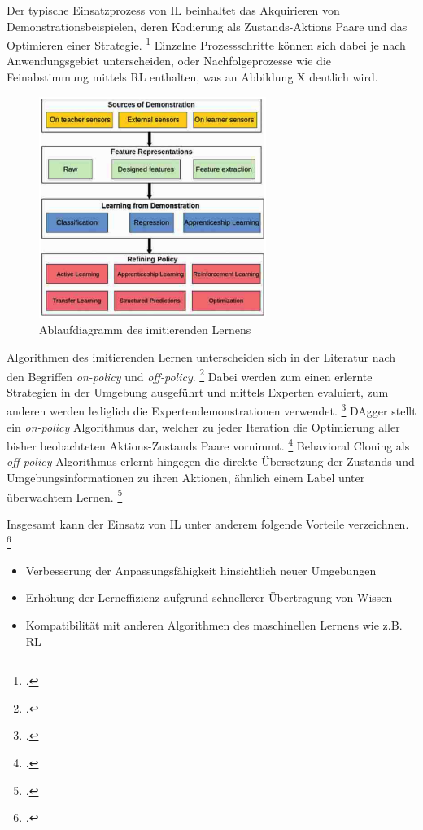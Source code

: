 Der typische Einsatzprozess von IL beinhaltet das Akquirieren von Demonstrationsbeispielen, deren Kodierung als Zustands-Aktions Paare und das Optimieren einer Strategie. \footcite[Vgl.][S. 3]{Hussein.2017}
Einzelne Prozessschritte können sich dabei je nach Anwendungsgebiet unterscheiden, oder Nachfolgeprozesse wie die Feinabstimmung mittels RL enthalten, was an Abbildung X deutlich wird.
\begin{figure}[htb]
    \centering
    \includegraphics[height=7.2cm]{lib/graphics/IL flowchart.png}
    \caption[Ablaufdiagramm des imitierenden Lernens]{Ablaufdiagramm des imitierenden Lernens\footnotemark}
    \label{abb:IL-process-flowchart}
\end{figure}

Algorithmen des imitierenden Lernen unterscheiden sich in der Literatur nach den Begriffen \textit{on-policy} und \textit{off-policy}. \footcite[Vgl.][S. 3]{Ashwin.2020}
Dabei werden zum einen erlernte Strategien in der Umgebung ausgeführt und mittels Experten evaluiert, zum anderen werden lediglich die Expertendemonstrationen verwendet. \footcite[Vgl.][S. 3]{Ashwin.2020}
DAgger stellt ein \textit{on-policy} Algorithmus dar, welcher zu jeder Iteration die Optimierung aller bisher beobachteten Aktions-Zustands Paare vornimmt. \footcite[Vgl.][S. 5]{attia.2018}
Behavioral Cloning als \textit{off-policy} Algorithmus erlernt hingegen die direkte Übersetzung der Zustands-und Umgebungsinformationen zu ihren Aktionen, ähnlich einem Label unter überwachtem Lernen. \footcite[Vgl.][S. 4]{fang.2019}

Insgesamt kann der Einsatz von IL unter anderem folgende Vorteile verzeichnen. \footcite[Vgl.][S. 1]{fang.2019}
\begin{itemize}
    \item Verbesserung der Anpassungsfähigkeit hinsichtlich neuer Umgebungen
    \item Erhöhung der Lerneffizienz aufgrund schnellerer Übertragung von Wissen
    \item Kompatibilität mit anderen Algorithmen des maschinellen Lernens wie z.B. RL
\end{itemize}

